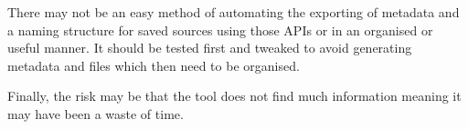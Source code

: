 \documentclass{article}
\begin{document}
There may not be an easy method of automating the exporting of metadata and a naming structure for saved sources using those APIs or in an organised or useful manner. It should be tested first and tweaked to avoid generating metadata and files which then need to be organised.\par

Finally, the risk may be that the tool does not find much information meaning it may have been a waste of time.\par
\end{document}
